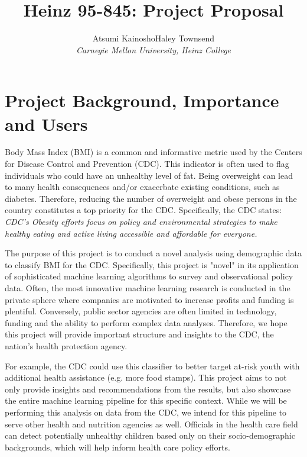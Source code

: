 \documentclass[twoside,11pt]{article}
\begin{document}
\title{Heinz 95-845: Project Proposal}
\author{Atsumi Kainosho\qquad Haley Townsend\\
\em Carnegie Mellon University, Heinz College}

\maketitle

\section{Project Background, Importance and Users}
Body Mass Index (BMI) is a common and informative metric used by the Centers for Disease Control and Prevention (CDC). This indicator is often used to flag individuals who could have an unhealthy level of fat. Being overweight can lead to many health consequences and/or exacerbate existing conditions, such as diabetes. Therefore, reducing the number of overweight and obese persons in the country constitutes a top priority for the CDC. Specifically, the CDC states: {\em CDC’s Obesity efforts focus on policy and environmental strategies to make healthy eating and active living accessible and affordable for everyone.}

The purpose of this project is to conduct a novel analysis using demographic data to classify BMI for the CDC. Specifically, this project is "novel" in its application of sophisticated machine learning algorithms to survey and observational policy data. Often, the most innovative machine learning research is conducted in the private sphere where companies are motivated to increase profits and funding is plentiful. Conversely, public sector agencies are often limited in technology, funding and the ability to perform complex data analyses. Therefore, we hope this project will provide important structure and insights to the CDC, the nation's health protection agency. 

For example, the CDC could use this classifier to better target at-risk youth with additional health assistance (e.g. more food stamps). This project aims to not only provide insights and recommendations from the results, but also showcase the entire machine learning pipeline for this specific context. While we will be performing this analysis on data from the CDC, we intend for this pipeline to serve other health and nutrition agencies as well. Officials in the health care field can detect potentially unhealthy children based only on their socio-demographic backgrounds, which will help inform health care policy efforts. 
\end{document}
